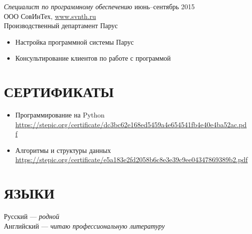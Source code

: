 \documentclass[line,margin]{resume}
\begin{document}
\begin{resume}
    {\sl Специалист по программному обеспечению} \hfill июнь--сентябрь 2015 \\
        ООО СовИнТех, \href{www.svnth.ru}{www.svnth.ru} \\
        Производственный департамент Парус
        \begin{itemize}  \itemsep -2pt %
            \item
                Настройка программной системы Парус 
            \item
                Консультирование клиентов по работе с программой 
        \end{itemize}

 
\section{СЕРТИФИКАТЫ}
    \begin{itemize}  \itemsep -2pt %
        \item
            Программирование на Python \\
            \href{https://stepic.org/certificate/dc3bc62e168ed5459a4e654541fb4e40e4ba52ac.pdf}{https://stepic.org/certificate/dc3bc62e168ed5459a4e654541fb4e40e4ba52ac.pdf}
        \item
            Алгоритмы и структуры данных \\
            \href{https://stepic.org/certificate/e5a183e2fd2058b6c8e3e39c9ee04347869389b2.pdf}{https://stepic.org/certificate/e5a183e2fd2058b6c8e3e39c9ee04347869389b2.pdf}
    \end{itemize}


\section{ЯЗЫКИ}
    Русский --- {\it родной} \\
    Английский --- {\it читаю профессиональную литературу} \\


\end{resume}
\end{document}
